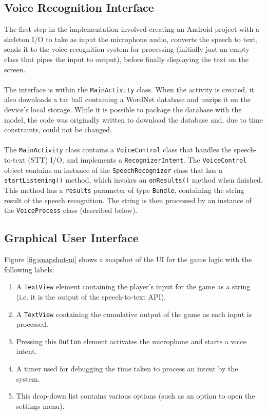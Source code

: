 \documentclass[11pt]{article}
\begin{document}
\subsection{Voice Recognition Interface}

The first step in the implementation involved creating an Android project with a skeleton I/O to take as input the microphone audio, converts the speech to text, sends it to the voice recognition system for processing (initially just an empty class that pipes the input to output), before finally displaying the text on the screen.
\\
\\
The interface is within the \texttt{MainActivity} class. When the activity is created, it also downloads a tar ball containing a WordNet database and unzips it on the device's local storage. While it is possible to package the database with the model, the code was originally written to download the database and, due to time constraints, could not be changed.
\\
\\
The \texttt{MainActivity} class contains a \texttt{VoiceControl} class that  handles the speech-to-text (STT) I/O, and implements a \texttt{RecognizerIntent}. The \texttt{VoiceControl} object contains an instance of the \texttt{SpeechRecognizer} class that has a \texttt{startListening()} method, which invokes an \texttt{onResults()} method when finished. This method has a \texttt{results} parameter of type \texttt{Bundle}, containing the string result of the speech recognition. The string is then processed by an instance of the \texttt{VoiceProcess} class (described below).

\subsection{Graphical User Interface}

Figure \ref{fig:snapshot-ui} shows a snapshot of the UI for the game logic with the following labels:

\begin{enumerate}
	\item A \texttt{TextView} element containing the player's input for the game as a string (i.e. it is the output of the speech-to-text API).
	\item A \texttt{TextView} containing the cumulative output of the game as each input is processed.
	\item Pressing this \texttt{Button} element activates the microphone and starts a voice intent.
	\item A timer used for debugging the time taken to process an intent by the system.
	\item This drop-down list contains various options (such as an option to open the settings menu).
\end{enumerate}
\end{document}
